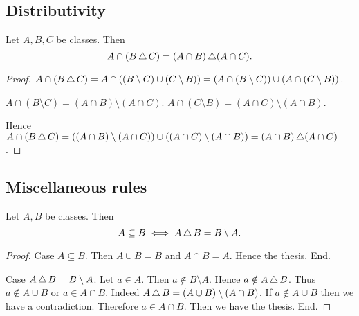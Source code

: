 \documentclass[../../set-theory/set-theory.tex]{subfiles}
\begin{document}
  \subsection*{Distributivity}

  \begin{forthel}
    \begin{proposition}
      Let $A, B, C$ be classes.
      Then \[ A \cap (B \mathop{\triangle} C) = (A \cap B) \mathop{\triangle} (A \cap C). \]
    \end{proposition}
    \begin{proof}
      $A \cap (B \mathop{\triangle} C) = A \cap ((B \setminus C) \cup (C \setminus B)) = (A \cap (B \setminus C)) \cup (A \cap (C \setminus B))$.

      $A \cap (B \setminus C) = (A \cap B) \setminus (A \cap C)$.
      $A \cap (C \setminus B) = (A \cap C) \setminus (A \cap B)$.

      Hence $A \cap (B \mathop{\triangle} C) = ((A \cap B) \setminus (A \cap C)) \cup ((A \cap C) \setminus (A \cap B)) = (A \cap B) \mathop{\triangle} (A \cap C)$.
    \end{proof}
  \end{forthel}


  \subsection*{Miscellaneous rules}

  \begin{forthel}
    \begin{proposition}
      Let $A, B$ be classes.
      Then \[ A \subseteq B \iff A \mathop{\triangle} B = B \setminus A. \]
    \end{proposition}
    \begin{proof}
      Case $A \subseteq B$.
        Then $A \cup B = B$ and $A \cap B = A$.
        Hence the thesis.
      End.

      Case $A \mathop{\triangle} B = B \setminus A$.
        Let $a \in A$.
        Then $a \notin B \setminus A$.
        Hence $a \notin A \mathop{\triangle} B$.
        Thus $a \notin A \cup B$ or $a \in A \cap B$.
        Indeed $A \mathop{\triangle} B = (A \cup B) \setminus (A \cap B)$.
        If $a \notin A \cup B$ then we have a contradiction.
        Therefore $a \in A \cap B$.
        Then we have the thesis.
      End.
    \end{proof}
  \end{forthel}
\end{document}
